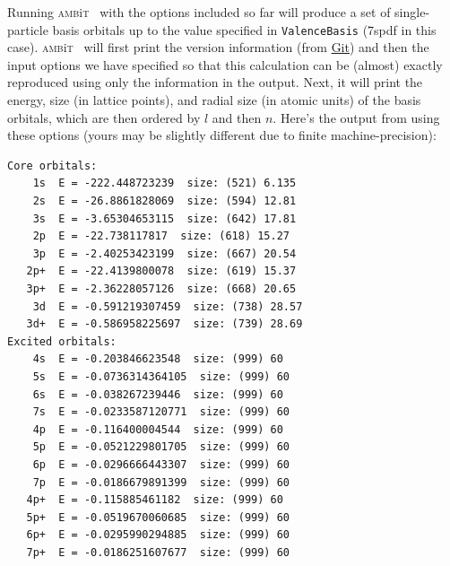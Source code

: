 \documentclass{report}
\newcommand{\ambit}{\textsc{amb}{\footnotesize i}\textsc{t}}
\begin{document}
Running \ambit~ with the options included so far will produce a set of single-particle basis orbitals up
to the value specified in \texttt{ValenceBasis} (7spdf in this case). \ambit~ will first print the 
version information (from \href{https://git-scm.com/}{Git}) and then the input options we have specified
so that this calculation can be (almost) exactly reproduced using only the information in the output.
Next, it will print the energy, size (in lattice points), and radial size (in atomic units) of the basis
orbitals, which are then ordered by $l$ and then $n$. Here's the output from using these options (yours
may be slightly different due to finite machine-precision):

\begin{verbatim}
Core orbitals:                                                                 
    1s  E = -222.448723239  size: (521) 6.135                                  
    2s  E = -26.8861828069  size: (594) 12.81                                  
    3s  E = -3.65304653115  size: (642) 17.81                                  
    2p  E = -22.738117817  size: (618) 15.27                                   
    3p  E = -2.40253423199  size: (667) 20.54                                  
   2p+  E = -22.4139800078  size: (619) 15.37                                  
   3p+  E = -2.36228057126  size: (668) 20.65                                  
    3d  E = -0.591219307459  size: (738) 28.57                                 
   3d+  E = -0.586958225697  size: (739) 28.69                                 
Excited orbitals:                                                              
    4s  E = -0.203846623548  size: (999) 60                                    
    5s  E = -0.0736314364105  size: (999) 60                                   
    6s  E = -0.038267239446  size: (999) 60                                    
    7s  E = -0.0233587120771  size: (999) 60                                   
    4p  E = -0.116400004544  size: (999) 60                                    
    5p  E = -0.0521229801705  size: (999) 60                                   
    6p  E = -0.0296666443307  size: (999) 60                                   
    7p  E = -0.0186679891399  size: (999) 60                                   
   4p+  E = -0.115885461182  size: (999) 60                                    
   5p+  E = -0.0519670060685  size: (999) 60                                   
   6p+  E = -0.0295990294885  size: (999) 60                                   
   7p+  E = -0.0186251607677  size: (999) 60                                   

\end{verbatim}
\end{document}
